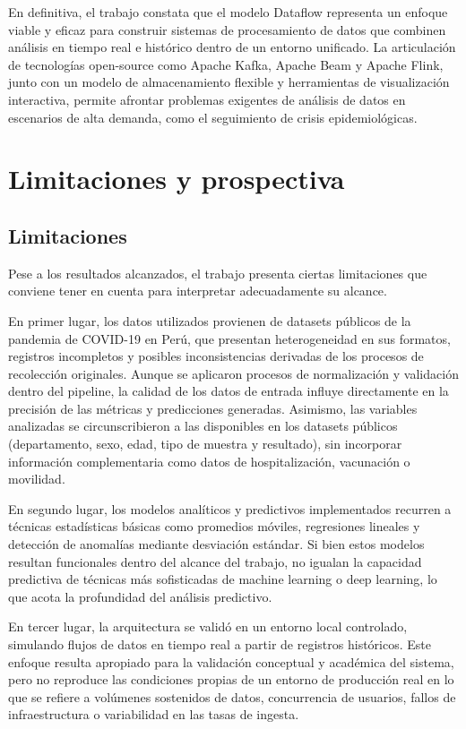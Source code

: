 \documentclass[12pt,a4paper]{article}
\begin{document}
En definitiva, el trabajo constata que el modelo Dataflow representa un enfoque viable y eficaz para construir sistemas de procesamiento de datos que combinen análisis en tiempo real e histórico dentro de un entorno unificado. La articulación de tecnologías open-source como Apache Kafka, Apache Beam y Apache Flink, junto con un modelo de almacenamiento flexible y herramientas de visualización interactiva, permite afrontar problemas exigentes de análisis de datos en escenarios de alta demanda, como el seguimiento de crisis epidemiológicas.

\clearpage
\section{Limitaciones y prospectiva}\label{limitaciones-y-prospectiva}

\subsection{Limitaciones}\label{limitaciones}

Pese a los resultados alcanzados, el trabajo presenta ciertas limitaciones que conviene tener en cuenta para interpretar adecuadamente su alcance.

En primer lugar, los datos utilizados provienen de datasets públicos de la pandemia de COVID-19 en Perú, que presentan heterogeneidad en sus formatos, registros incompletos y posibles inconsistencias derivadas de los procesos de recolección originales. Aunque se aplicaron procesos de normalización y validación dentro del pipeline, la calidad de los datos de entrada influye directamente en la precisión de las métricas y predicciones generadas. Asimismo, las variables analizadas se circunscribieron a las disponibles en los datasets públicos (departamento, sexo, edad, tipo de muestra y resultado), sin incorporar información complementaria como datos de hospitalización, vacunación o movilidad.

En segundo lugar, los modelos analíticos y predictivos implementados recurren a técnicas estadísticas básicas como promedios móviles, regresiones lineales y detección de anomalías mediante desviación estándar. Si bien estos modelos resultan funcionales dentro del alcance del trabajo, no igualan la capacidad predictiva de técnicas más sofisticadas de machine learning o deep learning, lo que acota la profundidad del análisis predictivo.

En tercer lugar, la arquitectura se validó en un entorno local controlado, simulando flujos de datos en tiempo real a partir de registros históricos. Este enfoque resulta apropiado para la validación conceptual y académica del sistema, pero no reproduce las condiciones propias de un entorno de producción real en lo que se refiere a volúmenes sostenidos de datos, concurrencia de usuarios, fallos de infraestructura o variabilidad en las tasas de ingesta.
\end{document}
